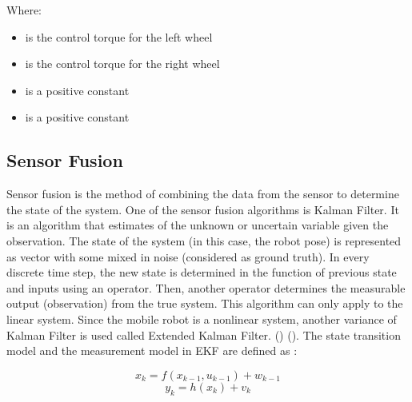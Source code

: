 Where:
\begin{itemize}
	\item { is the control torque for the left wheel}
	\item { is the control torque for the right wheel}
	\item { is a positive constant}
	\item { is a positive constant}
	
\end{itemize}






\break
\subsection{Sensor Fusion}
\hspace{1.27cm}
Sensor fusion is the method of combining the data from the sensor to determine the state of the system. One of the sensor fusion algorithms is Kalman Filter. It is an algorithm that estimates of the unknown or uncertain variable given the observation. The state of the system (in this case, the robot pose) is represented as vector with some mixed in noise (considered as ground truth). In every discrete time step, the new state is determined in the function of previous state and inputs using an operator. Then, another operator determines the measurable output (observation) from the true system. This algorithm can only apply to the linear system. Since the mobile robot is a nonlinear system, another variance of Kalman Filter is used called Extended Kalman Filter. (\cite{al2015multiple}) (\cite{moore2016generalized}). The state transition model and the measurement model in EKF are defined as :\par
\begin{equation}
    x_k = f(x_{k-1},u_{k-1}) + w_{k-1}
\end{equation}
\begin{equation}
    y_k = h(x_k) + v_k
\end{equation}

